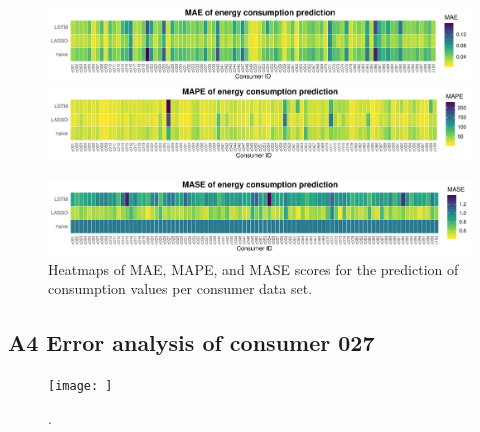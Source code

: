 \begin{centering}
\begin{figure}[H]
    \includegraphics[width=\textwidth]{thesis/graphs/evaluation/c_heatmap_MAE.pdf}
    \includegraphics[width=\textwidth]{thesis/graphs/evaluation/c_heatmap_MAPE.pdf}
\end{figure}
\begin{figure}[H]
     \includegraphics[width=\textwidth]{thesis/graphs/evaluation/c_heatmap_MASE.pdf}
     \caption[Heatmaps of MAE, MAPE, and MASE scores for the prediction of consumption values]{Heatmaps of MAE, MAPE, and MASE scores for the prediction of consumption values per consumer data set. \quantnet }
\end{figure}
\end{centering}


\subsection*{\hypertarget{AppA4:Figures:erroranalysis}{A4} Error analysis of consumer 027}\label{AppA4:Figures:erroranalysis}

\begin{centering}
\begin{figure}
    \texttt{[image: ]}
    \caption[]{. \quantnet\href{ }{}}
\end{figure}
\end{centering}


